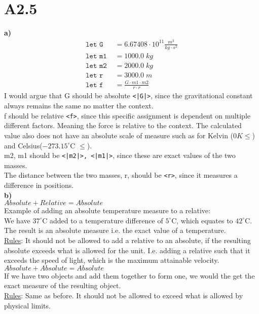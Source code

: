 \newpage
\section*{A2.5}
\textbf{a)}
\begin{align*}
      \texttt{let G } &= 6.67408\cdot 10^{11}\frac{m^3}{kg \cdot s^2}\\
      \texttt{let m1 }&= 1000.0\;kg\\
      \texttt{let m2 }&= 2000.0\; kg\\
      \texttt{let r } &= 3000.0\; m\\
      \texttt{let f } &= \frac{G\cdot m1 \cdot m2}{r \cdot r}
\end{align*}
I would argue that G should be absolute \texttt{<|G|>}, since the gravitational constant always remains the same no matter the context. \\

f should be relative \texttt{<f>}, since this specific assignment is dependent on multiple different factors. Meaning the force is relative to the context. The calculated value also does not have an absolute scale of measure such as for Kelvin ($0 K\leq$) and Celsius($-273.15^\circ$C $\leq$).\\

m2, m1 should be \texttt{<|m2|>, <|m1|>}, since these are exact values of the two masses.\\
The distance between the two masses, r, should be \texttt{<r>}, since it measures a difference in positions.\\

\textbf{b)}\\
$Absolute + Relative = Absolute$\\
Example of adding an absolute temperature measure to a relative: \\
We have $37^\circ$C added to a temperature difference of $5^\circ$C, which equates to $42^\circ$C. The result is an absolute measure i.e. the exact value of a temperature.\\
\underline{Rules}: It should not be allowed to add a relative to an absolute, if the resulting absolute exceeds what is allowed for the unit. I.e. adding a relative such that it exceeds the speed of light, which is the maximum attainable velocity.\\

$Absolute + Absolute = Absolute$\\
If we have two objects and add them together to form one, we would the get the exact measure of the resulting object.\\
\underline{Rules}: Same as before. It should not be allowed to exceed what is allowed by physical limits.\\


